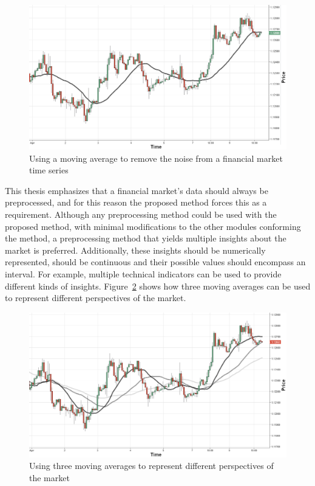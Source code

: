 \begin{figure}
  \centering
  \includegraphics[width=1.0\textwidth]{img/moving-average.png}
  \caption{Using a moving average to remove the noise from a financial market time
  series}
  \label{figure:moving-average-noise}
\end{figure}

This thesis emphasizes that a financial market's data should always be
preprocessed, and for this reason the proposed method forces this as a
requirement. Although any preprocessing method could be used with the proposed
method, with minimal modifications to the other modules conforming the method, a
preprocessing method that yields multiple insights about the market is
preferred. Additionally, these insights should be numerically represented,
should be continuous and their possible values should encompass an interval. For
example, multiple technical indicators can be used to provide different kinds of
insights. Figure~\ref{figure:multiple-technical-indicators} shows how three
moving averages can be used to represent different perspectives of the market.

\begin{figure}
\centering
\includegraphics[width=1.0\textwidth]{img/multiple-technical-indicators.png}
\caption{Using three moving averages to represent different perspectives of the
  market}
\label{figure:multiple-technical-indicators}
\end{figure}

